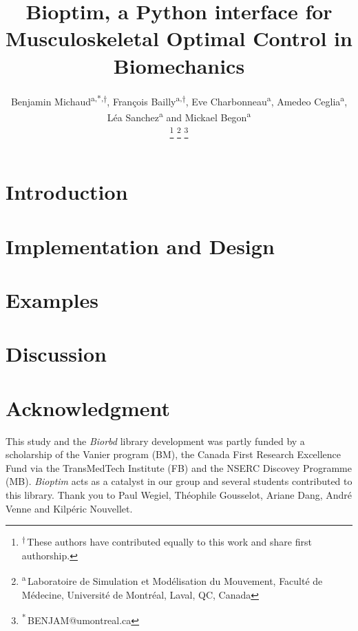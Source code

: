 \documentclass[letterpaper, 10 pt, conference]{ieeeconf}  %
\title{\LARGE \bf Bioptim, a Python interface for Musculoskeletal Optimal Control in Biomechanics}
\author{Benjamin Michaud\textsuperscript{a,*,$\dagger$}, François Bailly\textsuperscript{a,$\dagger$}, Eve Charbonneau\textsuperscript{a}, Amedeo Ceglia\textsuperscript{a}, Léa Sanchez\textsuperscript{a}  and  Mickael Begon\textsuperscript{a}%

\thanks{\textsuperscript{$\dagger$}\,These authors have contributed equally to this work and share first authorship.}
\thanks{\textsuperscript{a}\,Laboratoire de Simulation et Modélisation du Mouvement, Faculté de Médecine, Université de Montréal, Laval, QC, Canada}%
\thanks{\textsuperscript{*}\,BENJAM@umontreal.ca}
}
\newcommand{\bioptim}{\textit{Bioptim}\xspace}
\newcommand{\biorbd}{\textit{Biorbd}\xspace}
\begin{document}
\maketitle
\thispagestyle{plain}
\pagestyle{plain}



\section{Introduction}\label{sec:introduction}


\section{Implementation and Design}\label{sec:design&impl}


\section{Examples}\label{sec:Examples}


\section{Discussion}\label{sec:discussion}


\section*{Acknowledgment}
This study and the \biorbd library development was partly funded by a scholarship of the  Vanier program (BM), the Canada First Research Excellence Fund via the TransMedTech Institute (FB) and the NSERC Discovey Programme (MB). 
\bioptim acts as a catalyst in our group and several students contributed to this library. 
Thank you to Paul Wegiel, Théophile Gousselot, Ariane Dang, André Venne and Kilpéric Nouvellet. 




\end{document}
